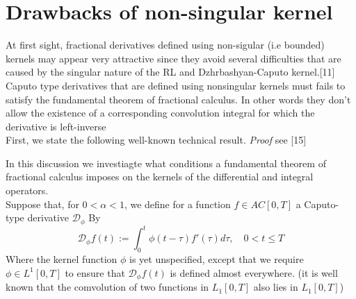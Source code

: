 \documentclass[twoside]{book}
\begin{document}
{

\section{Drawbacks of non-singular kernel}
At first sight, fractional derivatives defined using non-sigular (i.e bounded) kernels may appear very attractive since they avoid several difficulties that are caused by the singular nature of the RL and Dzhrbashyan-Caputo kernel.[11]\\


Caputo type derivatives that are defined using nonsingular kernels must fails to satisfy the fundamental theorem of fractional calculus. In other words they don't allow the existence of a corresponding convolution integral for which the derivative is left-inverse\\
\newline
{}
First, we state the following well-known technical result.
\textit{Proof} see [15]

In this discussion we investiagte what conditions a fundamental theorem of fractional calculus imposes on the kernels of the differential and integral operators.\\

Suppose that, for $0<\alpha<1$, we define for a function $f\in AC[0,T]$ a Caputo-type derivative $\mathcal{D}_\phi$ By
\begin{equation}
    \label{3}
    \mathcal{D}_{\phi} f(t) := \int_0^t \phi(t-\tau) f'(\tau) d\tau ,\quad 0<t\leq T
\end{equation}
Where the kernel function $\phi$ is yet unspecified, except that we require $\phi \in L^1[0,T]$ to ensure that $\mathcal{D}_{\phi}f(t)$ is defined almost everywhere. (it is well known that the comvolution of two functions in $L_1[0,T]$ also lies in $L_1[0,T]$)\\

}
\end{document}
